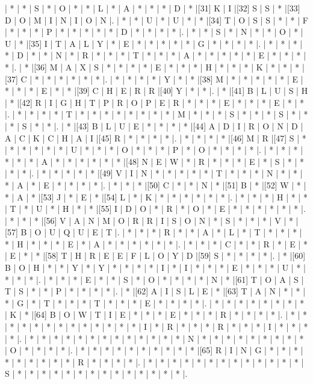 \begin{Puzzle}{46}{28}
| * | * | S | * | O | * | * | L | * | A | * | * | * | D | * |[31]  K | I |[32]  S | S | * |[33]  D | O | M | I | N | I | O | N |.
| * | * | U | * | U | * | * |[34]  T | O | S | S | * | * | F | * | * | * | P | * | * | * | * | * | D | * | * | * | * |.
| * | * | S | * | N | * | * | O | * | U | * |[35]  I | T | A | L | Y | * | E | * | * | * | * | * | G | * | * | * | * |.
| * | * | * | * | D | * | * | N | * | R | * | * | * | T | * | * | * | A | * | * | * | * | * | E | * | * | * | * |.
| * |[36]  M | A | X | S | * | * | * | * | E | * | * | * | H | * | * | * | K | * | * | * |[37]  C | * | * | * | * | * | * |.
| * | * | * | * | Y | * | * |[38]  M | * | * | * | * | * | E | * | * | * | E | * | * |[39]  C | H | E | R | R |[40]  Y | * | * |.
| * |[41]  B | L | U | S | H | * |[42]  R | I | G | H | T | P | R | O | P | E | R | * | * | * | E | * | * | * | E | * | * |.
| * | * | * | * | T | * | * | * | * | * | * | * | * | M | * | * | * | S | * | * | * | S | * | * | * | S | * | * |.
| * |[43]  B | L | U | E | * | * | * | * |[44]  A | D | I | R | O | N | D | A | C | K | C | H | A | I |[45]  R | * | * | * | * |.
| * | * | * | * |[46]  M | R |[47]  S | * | * | * | * | * | * | U | * | * | * | O | * | * | * | P | * | O | * | * | * | * |.
| * | * | * | * | * | * | A | * | * | * | * | * | * |[48]  N | E | W | * | R | * | * | * | E | * | S | * | * | * | * |.
| * | * | * | * | * |[49]  V | I | N | * | * | * | * | * | T | * | * | * | N | * | * | * | A | * | E | * | * | * | * |.
| * | * | * |[50]  C | * | * | N | * |[51]  B | * |[52]  W | * | * | A | * |[53]  J | * | E | * |[54]  L | * | K | * | * | * | * | * | * |.
| * | * | * | H | * | * | T | * | U | * | H | * | * |[55]  I | D | O | * | R | * | O | * | E | * | * | * | * | * | * |.
| * | * | * |[56]  V | A | N | M | O | R | R | I | S | O | N | * | S | * | * | * | V | * |[57]  B | O | U | Q | U | E | T |.
| * | * | * | R | * | * | A | * | L | * | T | * | * | * | * | H | * | * | * | E | * | A | * | * | * | * | * | * |.
| * | * | * | C | * | * | R | * | E | * | E | * | * |[58]  T | H | R | E | E | F | L | O | Y | D |[59]  S | * | * | * | * |.
| * |[60]  B | O | H | * | * | Y | * | Y | * | * | * | * | I | * | I | * | * | * | E | * | * | * | U | * | * | * | * |.
| * | * | * | E | * | * | S | * | O | * | * | * | * | N | * |[61]  T | O | A | S | T | S | * | * | P | * | * | * | * |.
| * |[62]  A | I | S | L | E | * |[63]  T | A | N | * | * | * | G | * | T | * | * | * | T | * | * | * | E | * | * | * | * |.
| * | * | * | * | * | * | * | * | K | * |[64]  B | O | W | T | I | E | * | * | * | E | * | * | * | R | * | * | * | * |.
| * | * | * | * | * | * | * | * | * | * | * | * | * | I | * | R | * | * | * | R | * | * | * | I | * | * | * | * |.
| * | * | * | * | * | * | * | * | * | * | * | * | * | N | * | * | * | * | * | * | * | * | * | O | * | * | * | * |.
| * | * | * | * | * | * | * | * | * | * |[65]  R | I | N | G | * | * | * | * | * | * | * | * | * | R | * | * | * | * |.
| * | * | * | * | * | * | * | * | * | * | * | * | * | S | * | * | * | * | * | * | * | * | * | * | * | * | * | * |.
\end{Puzzle}
